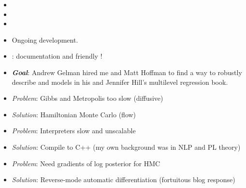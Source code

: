 \documentclass[10pt]{report}
\begin{document}
%
\begin{itemize}
\item {}
\item {}
\item {}
\item Ongoing  development.
\item {}: documentation and friendly !
\end{itemize}


%
\begin{itemize}
\item {\slshape\bfseries Goal}: Andrew Gelman hired me and Matt Hoffman to find a way to robustly describe and models in his and Jennifer Hill's multilevel regression book.
\end{itemize}
%
\vspace*{2pt}
\begin{itemize}
\item {\slshape Problem}: Gibbs and Metropolis too slow (diffusive)
\item {\slshape Solution}: Hamiltonian Monte Carlo (flow)
%
\vspace*{8pt}
\item {\slshape Problem}:  Interpreters slow and unscalable
\item {\slshape Solution}: Compile to C++ (my own background was in NLP and PL theory)
%
\vspace*{8pt}
\item {\slshape Problem}:  Need gradients of log posterior for HMC
\item {\slshape Solution}: Reverse-mode automatic differentiation (fortuitous blog response)
\end{itemize}
\end{document}
